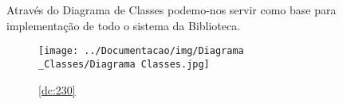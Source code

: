 \section{}

Através do Diagrama de Classes podemo-nos servir como base para implementação de todo o sistema da Biblioteca.

\begin{figure}[H]
	\centering
	\texttt{[image: ../Documentacao/img/Diagrama\\\_Classes/Diagrama Classes.jpg]}  %
	\caption{\ref{dc:230}}
	\label{fig:chap230}
\end{figure}
